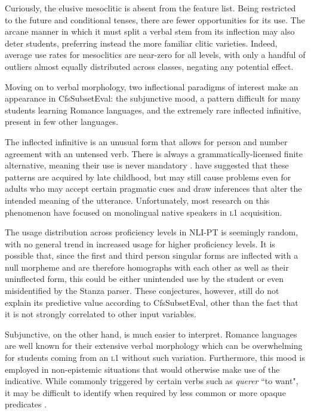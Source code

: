 Curiously, the elusive mesoclitic is absent from the feature list. Being restricted to the future and conditional tenses, there are fewer opportunities for its use. The arcane manner in which it must split a verbal stem from its inflection may also deter students, preferring instead the more familiar clitic varieties. Indeed, average use rates for mesoclitics are near-zero for all levels, with only a handful of outliers almost equally distributed across classes, negating any potential effect.

Moving on to verbal morphology, two inflectional paradigms of interest make an appearance in CfsSubsetEval: the subjunctive mood, a pattern difficult for many students learning Romance languages, and the extremely rare inflected infinitive, present in few other languages.

The inflected infinitive is an unusual form that allows for person and number agreement with an untensed verb. There is always a grammatically-licensed finite alternative, meaning their use is never mandatory \citep{iverson2008}.  have suggested that these patterns are acquired by late childhood, but may still cause problems even for adults who may accept certain pragmatic cues and draw inferences that alter the intended meaning of the utterance. Unfortunately, most research on this phenomenon have focused on monolingual native speakers in {\scshape l1} acquisition.

The usage distribution across proficiency levels in NLI-PT is seemingly random, with no general trend in increased usage for higher proficiency levels. It is possible that, since the first and third person singular forms are inflected with a null morpheme and are therefore homographs with each other as well as their uninflected form, this could be either unintended use by the student or even misidentified by the Stanza parser. These conjectures, however, still do not explain its predictive value according to CfsSubsetEval, other than the fact that it is not strongly correlated to other input variables.

Subjunctive, on the other hand, is much easier to interpret. Romance languages are well known for their extensive verbal morphology which can be overwhelming for students coming from an {\scshape l1} without such variation. Furthermore, this mood is employed in non-epistemic situations that would otherwise make use of the indicative. While commonly triggered by certain verbs such as \textit{querer} ``to want", it may be difficult to identify when required by less common or more opaque predicates \citep{flores2016, jesus2019}.

